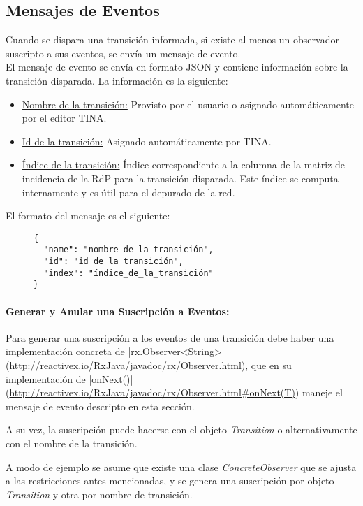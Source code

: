 \subsection{Mensajes de Eventos}
\label{mensaje_eventos}

Cuando se dispara una transición informada, si existe al menos un observador
suscripto a sus eventos, se envía un mensaje de evento.\\
El mensaje de evento se envía en formato JSON y contiene información sobre la
transición disparada. La información es la siguiente:

\begin{itemize}
    \item \underline{Nombre de la transición:} Provisto por el usuario o
    asignado automáticamente por el editor TINA.
    \item \underline{Id de la transición:} Asignado automáticamente por TINA.
    \item \underline{Índice de la transición:} Índice correspondiente a la
    columna de la matriz de incidencia de la RdP para la transición disparada.
    Este índice se computa internamente y es útil para el depurado de la red.
\end{itemize}

El formato del mensaje es el siguiente:

\begin{figure}[H]
\centering
\begin{verbatim}
{
  "name": "nombre_de_la_transición",
  "id": "id_de_la_transición",
  "index": "índice_de_la_transición"
}
\end{verbatim}
\end{figure}

\paragraph{Generar y Anular una Suscripción a Eventos:}
Para generar una suscripción a los eventos de una transición debe haber una
implementación concreta de |rx.Observer<String>|
(\url{http://reactivex.io/RxJava/javadoc/rx/Observer.html}), que en su
implementación de |onNext()| 
(\url{http://reactivex.io/RxJava/javadoc/rx/Observer.html#onNext(T)})
maneje el mensaje de evento descripto en esta sección.

A su vez, la suscripción puede hacerse con el objeto \textit{Transition} o
alternativamente con el nombre de la transición.

A modo de ejemplo se asume que existe una clase \textit{ConcreteObserver} que se
ajusta a las restricciones antes mencionadas, y se genera una suscripción por
objeto \textit{Transition} y otra por nombre de transición.

